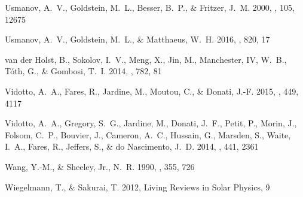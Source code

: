 \documentclass[apj]{emulateapj}
\begin{document}
\begin{thebibliography}{42}
{Usmanov}, A.~V., {Goldstein}, M.~L., {Besser}, B.~P., \& {Fritzer}, J.~M.
  2000, \jgr, 105, 12675

{Usmanov}, A.~V., {Goldstein}, M.~L., \& {Matthaeus}, W.~H. 2016, \apj, 820, 17

{van der Holst}, B., {Sokolov}, I.~V., {Meng}, X., {Jin}, M., {Manchester}, IV,
  W.~B., {T{\'o}th}, G., \& {Gombosi}, T.~I. 2014, \apj, 782, 81

{Vidotto}, A.~A., {Fares}, R., {Jardine}, M., {Moutou}, C., \& {Donati}, J.-F.
  2015, \mnras, 449, 4117

{Vidotto}, A.~A., {Gregory}, S.~G., {Jardine}, M., {Donati}, J.~F., {Petit},
  P., {Morin}, J., {Folsom}, C.~P., {Bouvier}, J., {Cameron}, A.~C., {Hussain},
  G., {Marsden}, S., {Waite}, I.~A., {Fares}, R., {Jeffers}, S., \& {do
  Nascimento}, J.~D. 2014, \mnras, 441, 2361

{Wang}, Y.-M., \& {Sheeley}, Jr., N.~R. 1990, \apj, 355, 726

{Wiegelmann}, T., \& {Sakurai}, T. 2012, Living Reviews in Solar Physics, 9

\end{thebibliography}


%
%

\end{document}
